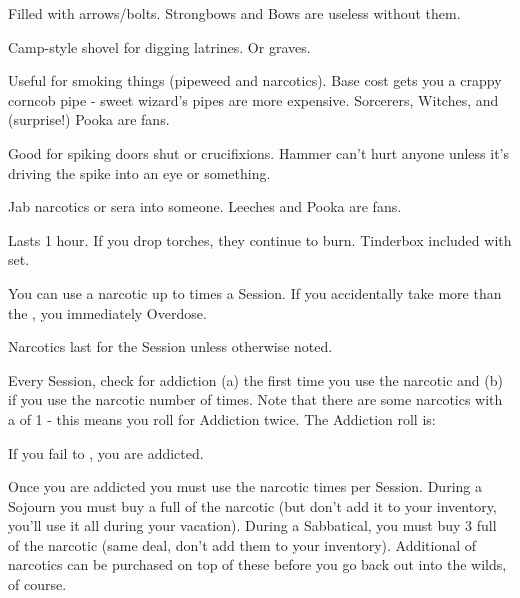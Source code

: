 {\begin{multicols}{2}
   Filled with arrows/bolts.  Strongbows and Bows are useless without them.
  
   Camp-style shovel for digging latrines.  Or graves.
  
   Useful for smoking things (pipeweed and narcotics). Base cost gets you a crappy corncob pipe - sweet wizard's pipes are more expensive.  Sorcerers, Witches, and (surprise!) Pooka are fans.
  
   Good for spiking doors shut or crucifixions.  Hammer can't hurt anyone unless it's driving the spike into an eye or something.
  
   Jab narcotics or sera into someone.  Leeches and Pooka are fans.
  
   Lasts 1 hour. If you drop torches, they continue to burn.  Tinderbox included with set.

  \newpage


  You can use a narcotic up to \MAX times a Session.  If you accidentally take more than the \MAX, you immediately Overdose. 

  Narcotics last for the Session unless otherwise noted.

  Every Session, check for addiction (a) the first time you use the narcotic and (b) if you use the narcotic \MAX number of times.  Note that there are some narcotics with a \MAX of 1 - this means you roll for Addiction twice. The Addiction roll is:


  If you fail to \RO, you are addicted.  

  Once you are addicted you must use the narcotic \MAX times per Session.  During a Sojourn you must buy a full \UD of the narcotic (but don't add it to your inventory, you'll use it all during your vacation).  During a Sabbatical, you must buy 3 full \UD of the narcotic (same deal, don't add them to your inventory).  Additional \UD of narcotics can be purchased on top of these before you go back out into the wilds, of course.


\end{multicols}}
